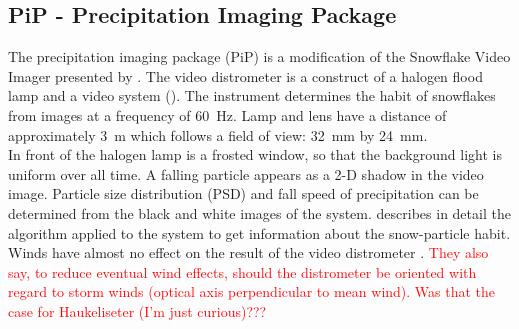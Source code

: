 \subsection{PiP - Precipitation Imaging Package}

The precipitation imaging package (PiP) is a modification of the Snowflake Video Imager presented by \cite{newman_presenting_2009}. The video distrometer is a construct of a halogen flood lamp and a video system (). The instrument determines the habit of snowflakes from images at a frequency of \SI{60}{\Hz}. Lamp and lens have a distance of approximately \SI{3}{\metre} which follows a field of view: \SI{32}{\mm} by \SI{24}{\mm}. 
\\
In front of the halogen lamp is a frosted window, so that the background light is uniform over all time. A falling particle appears as a 2-D shadow in the video image. 
Particle size distribution (PSD) and fall speed of precipitation can be determined from the black and white images of the system.
\cite{newman_presenting_2009} describes in detail the algorithm applied to the system to get information about the snow-particle habit. \\
Winds have almost no effect on the result of the video distrometer \citep{newman_presenting_2009}. \textcolor{red}{They also say, to reduce eventual wind effects, should the distrometer be oriented with regard to storm winds (optical axis perpendicular to mean wind). Was that the case for Haukeliseter (I'm just curious)???}

\newpage
